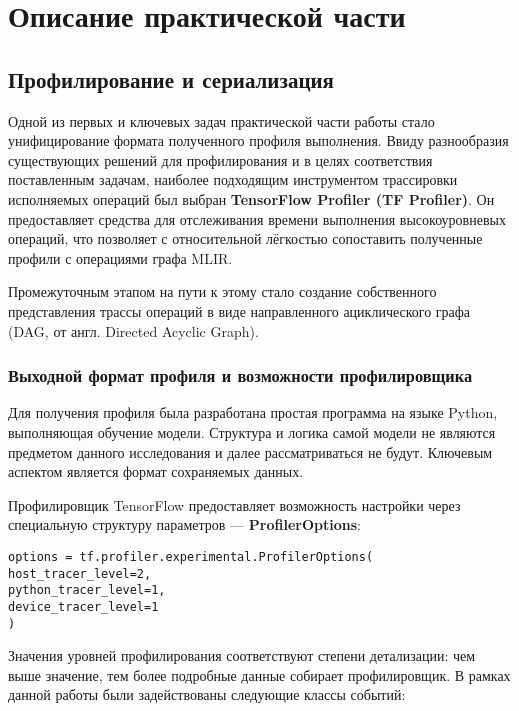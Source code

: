 \section{Описание практической части}
\label{sec:Chapter3} 

\subsection{Профилирование и сериализация}

Одной из первых и ключевых задач практической части работы стало унифицирование формата полученного профиля выполнения.
Ввиду разнообразия существующих решений для профилирования и в целях соответствия поставленным задачам, наиболее подходящим инструментом трассировки исполняемых операций был выбран \textbf{TensorFlow Profiler (TF Profiler)}.
Он предоставляет средства для отслеживания времени выполнения высокоуровневых операций, что позволяет с относительной лёгкостью сопоставить полученные профили с операциями графа MLIR.

Промежуточным этапом на пути к этому стало создание собственного представления трассы операций в виде направленного ациклического графа (DAG, от англ. Directed Acyclic Graph).

\subsubsection{Выходной формат профиля и возможности профилировщика}

Для получения профиля была разработана простая программа на языке Python, выполняющая обучение модели.
Структура и логика самой модели не являются предметом данного исследования и далее рассматриваться не будут.
Ключевым аспектом является формат сохраняемых данных.

Профилировщик TensorFlow предоставляет возможность настройки через специальную структуру параметров — \textbf{ProfilerOptions}:

\begin{lstlisting}[caption={Опции профилирования \textbf{TF Profiler}}]
options = tf.profiler.experimental.ProfilerOptions(
host_tracer_level=2,
python_tracer_level=1,
device_tracer_level=1
)
\end{lstlisting}

Значения уровней профилирования соответствуют степени детализации: чем выше значение, тем более подробные данные собирает профилировщик.
В рамках данной работы были задействованы следующие классы событий:

